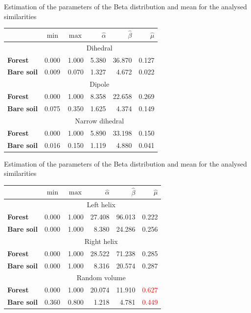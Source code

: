 \documentclass[10pt]{beamer}
\begin{document}
\begin{frame}[fragile]{Estimation of the parameters of the Beta distribution and mean for the analysed similarities}
    \begin{table}[hbt]
    \centering
    \begin{tabular}{lrrrrr}
    \toprule
    & $\min$ & $\max$ & $\widehat\alpha$ & $\widehat\beta$ & $\widehat\mu$\\ \midrule
    & \multicolumn{5}{c}{Dihedral}\\
    \cmidrule(lr){2-6}
    \textbf{Forest} & 0.000 & 1.000 & 5.380 & 36.870 & 0.127\\
    \textbf{Bare soil} & 0.009 & 0.070 & 1.327 & 4.672 & 0.022\\
    \midrule
    & \multicolumn{5}{c}{Dipole}\\
    \cmidrule(lr){2-6}
    \textbf{Forest} & 0.000 & 1.000 & 8.358 & 22.658 & 0.269\\
    \textbf{Bare soil} & 0.075 & 0.350 & 1.625 & 4.374 & 0.149\\
    \midrule
    & \multicolumn{5}{c}{Narrow dihedral}\\
    \cmidrule(lr){2-6}
    \textbf{Forest} & 0.000 & 1.000 & 5.890 & 33.198 & 0.150\\
    \textbf{Bare soil} & 0.016 & 0.150 & 1.119 & 4.880 & 0.041\\
    \bottomrule
    \end{tabular}
    \end{table}
\end{frame}

\begin{frame}[fragile]{Estimation of the parameters of the Beta distribution and mean for the analysed similarities}
    \begin{table}[hbt]
    \centering
    \begin{tabular}{lrrrrr}
    \toprule
    & $\min$ & $\max$ & $\widehat\alpha$ & $\widehat\beta$ & $\widehat\mu$\\ \midrule
    & \multicolumn{5}{c}{Left helix}\\
    \cmidrule(lr){2-6}
    \textbf{Forest} & 0.000 & 1.000 & 27.408 & 96.013 & 0.222\\
    \textbf{Bare soil} & 0.000 & 1.000 & 8.380 & 24.286 & 0.256\\
    \midrule
    & \multicolumn{5}{c}{Right helix}\\
    \cmidrule(lr){2-6}
    \textbf{Forest} & 0.000 & 1.000 & 28.522 & 71.238 & 0.285\\
    \textbf{Bare soil} & 0.000 & 1.000 & 8.316 & 20.574 & 0.287\\
    \midrule
    & \multicolumn{5}{c}{Random volume}\\
    \cmidrule(lr){2-6}
    \textbf{Forest} & 0.000 & 1.000 & 20.074 & 11.910 & \textcolor{red}{0.627}\\
    \textbf{Bare soil} & 0.360 & 0.800 & 1.218 & 4.781 & \textcolor{red}{0.449}\\
    \bottomrule
    \end{tabular}
    \end{table}
\end{frame}
\end{document}
